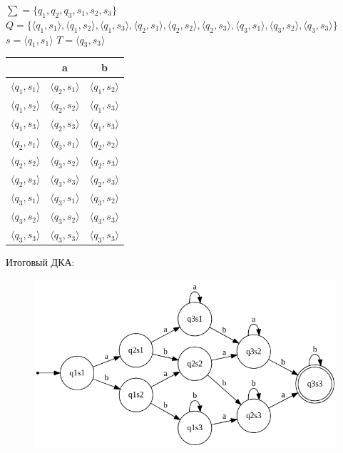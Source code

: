 \documentclass[a4paper,12pt]{article}
\begin{document}
$\sum = \{q_1, q_2, q_3, s_1, s_2, s_3\}$\newline
\normalsize $Q = \{\langle q_1 , s_1 \rangle ,\langle q_1 , s_2 \rangle ,\langle q_1 , s_3 \rangle , \langle q_2 , s_1 \rangle , \langle q_2 , s_2 \rangle , \langle q_2 , s_3 \rangle , \langle q_3 , s_1 \rangle , \langle q_3 , s_2 \rangle , \langle q_3 , s_3 \rangle \}$\newline
\Large $s = \langle q_1 , s_1 \rangle$\newline
$T = \langle q_3 , s_3 \rangle$\newline
\begin{center}
\begin{tabular}{ |c|c|c| } 
\hline
  & a & b \\ [0.5ex] 
 \hline
 $\langle q_1 , s_1 \rangle$ & $\langle q_2 , s_1 \rangle$ & $\langle q_1 , s_2 \rangle$ \\ 
 $\langle q_1 , s_2 \rangle $ & $\langle q_2 , s_2 \rangle$ & $\langle q_1 , s_3 \rangle$ \\ 
 $\langle q_1 , s_3 \rangle $ & $\langle q_2 , s_3 \rangle$ & $\langle q_1 , s_3 \rangle$ \\ 
 $\langle q_2 , s_1 \rangle $ & $\langle q_3 , s_1 \rangle$ & $\langle q_2 , s_2 \rangle$ \\ 
 $\langle q_2 , s_2 \rangle $ & $\langle q_3 , s_2 \rangle$ & $\langle q_2 , s_3 \rangle$ \\
 $\langle q_2 , s_3 \rangle $ & $\langle q_3 , s_3 \rangle$ & $\langle q_2 , s_3 \rangle$ \\
 $\langle q_3 , s_1 \rangle $ & $\langle q_3 , s_1 \rangle$ & $\langle q_3 , s_2 \rangle$ \\
 $\langle q_3 , s_2 \rangle $ & $\langle q_3 , s_2 \rangle$ & $\langle q_3 , s_3 \rangle$ \\
 $\langle q_3 , s_3 \rangle $ & $\langle q_3 , s_3 \rangle$ & $\langle q_3 , s_3 \rangle$ \\
 \hline
\end{tabular}
\end{center}
\endgroup
\begingroup
\raggedright 
Итоговый ДКА: \newline
\begin{figure}[h]
\centering
\includegraphics[scale=0.6]{2_1}
\end{figure}\newline
\end{document}
